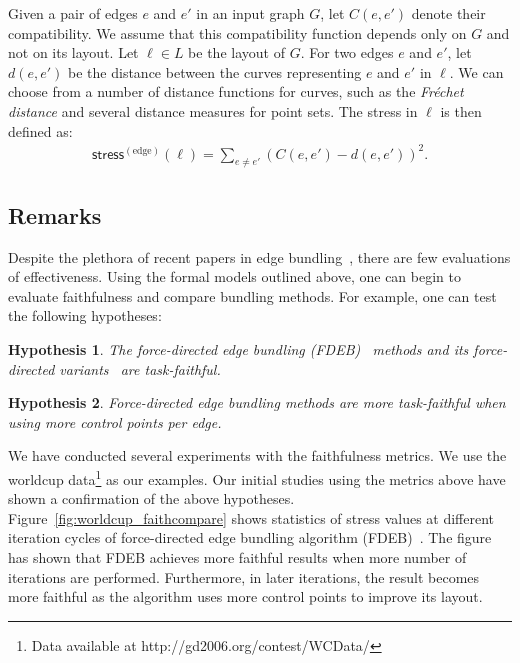 \documentclass[10pt,journal,cspaper,compsoc]{IEEEtran}
\newcommand{\stress}{\textsf{stress}}
\newtheorem{Hypothesis}{Hypothesis}
\begin{document}
Given a pair of edges $e$ and $e'$ in an input graph $G$, let $C(e,e')$ denote their compatibility. We assume that this compatibility function depends only on $G$ and not on its layout. Let $\ell \in L$ be the layout of $G$. For two edges $e$ and $e'$, let $d(e,e')$ be the distance between the curves representing $e$ and $e'$ in $\ell$. We can choose from a number of distance functions for curves, such as the \emph{Fr\'{e}chet distance} and several distance measures for point sets.
The stress in $\ell$ is then defined as:
\begin{align}
\stress^{(\text{edge})}(\ell)= \sum_{e\neq e'}{ (C(e,e') - d(e,e'))^2}.
\end{align}



\subsection{Remarks}
Despite the plethora of recent papers in edge bundling~\cite{hurtersmooth}, there are few evaluations of effectiveness. Using the formal models outlined above, one can begin to evaluate faithfulness and compare bundling methods. For example, one can test the following hypotheses:
\begin{Hypothesis}
The force-directed edge bundling (FDEB)~\cite{holten} methods and its force-directed variants~\cite{kienreich2010application,nguyen2011tgi,selassie2011divided} are task-faithful.
\end{Hypothesis}
\begin{Hypothesis}
Force-directed edge bundling methods are {\em more} task-faithful when using {\em more} control points per edge.
\end{Hypothesis}


We have conducted several experiments with the faithfulness metrics. We use the worldcup data\footnote{Data available at http://gd2006.org/contest/WCData/} as our examples.
Our initial studies using the metrics above have shown a confirmation of the above hypotheses.
Figure~\ref{fig:worldcup_faithcompare} shows statistics of stress values at different iteration cycles of force-directed edge bundling algorithm (FDEB)~\cite{holten}. The figure has shown that FDEB achieves more faithful results when more number of iterations are performed. Furthermore, in later iterations, the result becomes more faithful as the algorithm uses more control points to improve its layout.
\end{document}
